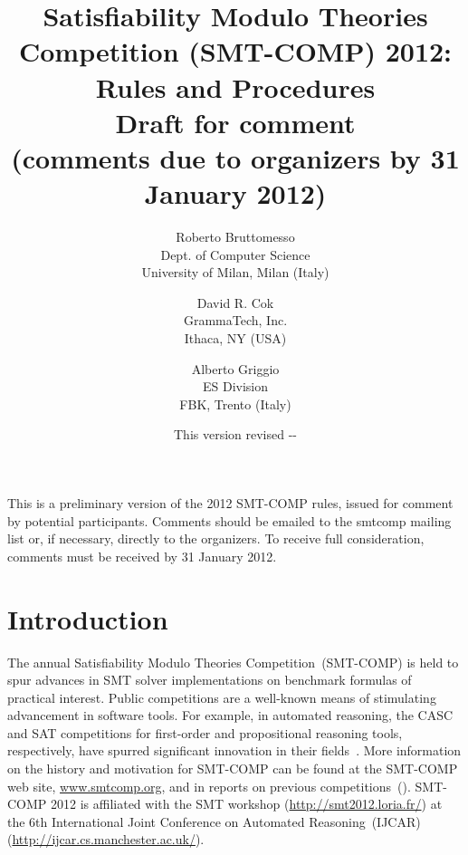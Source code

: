 \documentclass[12pt]{article}
\begin{document}
\date{\small This version revised \the\year-\the\month-\the\day}

\title{Satisfiability Modulo Theories Competition (SMT-COMP) 2012: Rules and 
Procedures \\
\small{Draft for comment \\
(comments due to organizers by 31 January 2012)}
}

\def\doauthor#1{{%
  \hsize.5\hsize \advance\hsize by-1cm %
  \def\\{\hss\egroup\hbox to\hsize\bgroup\strut\hss}%
  \vbox{\hbox to\hsize\bgroup\strut\hss#1\hss\egroup}}}%

\def\header#1{\medskip\noindent\textbf{#1}}

\author{
Roberto Bruttomesso\\
Dept. of Computer Science\\
University of Milan, Milan (Italy)
\and
David R. Cok \\
GrammaTech, Inc. \\
Ithaca, NY (USA) \\
\and
Alberto Griggio\\
ES Division\\
FBK, Trento (Italy)
}

\maketitle

\def\eg{\textit{e.g.}}
\def\ie{\textit{i.e.}}

\noindent This is a preliminary version of the 2012 SMT-COMP rules, issued for comment
by potential participants. Comments should be emailed to the smtcomp mailing
list or, if necessary, directly to the organizers. To receive full consideration,
comments must be received by 31 January 2012.

\section{Introduction}
\label{sec:intro}

The annual Satisfiability Modulo Theories Competition~(SMT-COMP) is
held to spur advances in SMT solver implementations on benchmark
formulas of practical interest.  Public competitions are a well-known
means of stimulating advancement in software tools.  For example, in
automated reasoning, the CASC and SAT competitions for first-order and
propositional reasoning tools, respectively, have spurred significant
innovation in their fields~\cite{PSS02,leberre+03}.  More information
on the history and motivation for SMT-COMP can be found at the
SMT-COMP web site, \url{www.smtcomp.org}, and in reports on previous
competitions~(\cite{SMTCOMP-2008,BDOS08,SMTCOMP-FMSD,SMTCOMP-JAR}).
SMT-COMP 2012 is affiliated with the SMT workshop (\url {http://smt2012.loria.fr/}) at the 6th International
Joint Conference on Automated Reasoning~(IJCAR) (\url{http://ijcar.cs.manchester.ac.uk/}).
\end{document}
